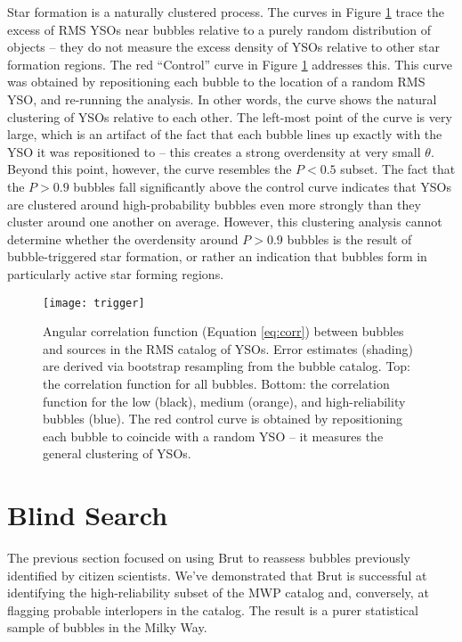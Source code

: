 \documentclass[preprint]{aastex}
\begin{document}
Star formation is a naturally clustered process. The curves in Figure \ref{fig:trigger} trace the excess of RMS YSOs near bubbles relative to a purely random distribution of objects -- they do not measure the excess density of YSOs relative to other star formation regions. The red ``Control'' curve in Figure \ref{fig:trigger} addresses this. This curve was obtained by repositioning each bubble to the location of a random RMS YSO, and re-running the analysis. In other words, the curve shows the natural clustering of YSOs relative to each other. The left-most point of the curve is very large, which is an artifact of the fact that each bubble lines up exactly with the YSO it was repositioned to -- this creates a strong overdensity at very small $\theta$. Beyond this point, however, the curve resembles the $P < 0.5$ subset. The fact that the $P > 0.9$ bubbles fall significantly above the control curve indicates that YSOs are clustered around high-probability bubbles even more strongly than they cluster around one another on average. However, this clustering analysis cannot determine whether the overdensity around $P > 0.9$ bubbles is the result of bubble-triggered star formation, or rather an indication that bubbles form in particularly active star forming regions. 

\begin{figure}[h!]
\texttt{[image: trigger]}
\caption{Angular correlation function (Equation \ref{eq:corr}) between bubbles and sources in the RMS catalog of YSOs. Error estimates (shading) are derived via bootstrap resampling from the bubble catalog. Top: the correlation function for all bubbles. Bottom: the correlation function for the
low (black), medium (orange), and high-reliability bubbles (blue). The red control curve is obtained by repositioning each bubble to coincide with a random YSO -- it measures the general clustering of YSOs.}
\label{fig:trigger}
\end{figure}

\section{Blind Search}
\label{sec:blind}
The previous section focused on using Brut to reassess bubbles previously identified by citizen scientists. We've demonstrated that Brut is successful at identifying the high-reliability subset of the MWP catalog and, conversely, at flagging probable interlopers in the catalog. The result is a purer statistical sample of bubbles in the Milky Way.
\end{document}
